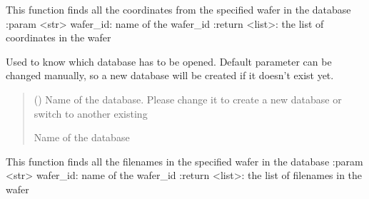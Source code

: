 \documentclass[letterpaper,10pt,english]{sphinxmanual}
\begin{document}

\begin{fulllineitems}
\label{\detokenize{getter:getter.get_coords}}
\pysigstartsignatures
{}
\pysigstopsignatures
\sphinxAtStartPar
This function finds all the coordinates from the specified wafer in the database
:param \textless{}str\textgreater{} wafer\_id: name of the wafer\_id
:return \textless{}list\textgreater{}: the list of coordinates in the wafer

\end{fulllineitems}


\begin{fulllineitems}
\label{\detokenize{getter:getter.get_db_name}}
\pysigstartsignatures
{}
\pysigstopsignatures
\sphinxAtStartPar
Used to know which database has to be opened. Default parameter can be changed manually, so a new database will be created if it doesn’t exist yet.
\begin{quote}\begin{description}
\sphinxAtStartPar
{} () \textendash{} Name of the database. Please change it to create a new database or switch to another existing

\sphinxAtStartPar
Name of the database

\end{description}\end{quote}

\end{fulllineitems}


\begin{fulllineitems}
\label{\detokenize{getter:getter.get_filenames}}
\pysigstartsignatures
{}
\pysigstopsignatures
\sphinxAtStartPar
This function finds all the filenames in the specified wafer in the database
:param \textless{}str\textgreater{} wafer\_id: name of the wafer\_id
:return \textless{}list\textgreater{}: the list of filenames in the wafer

\end{fulllineitems}
\end{document}
